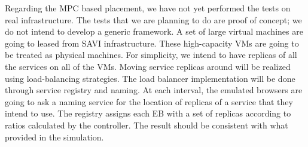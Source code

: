  Regarding the MPC based placement, we have not yet performed the tests on real infrastructure.  The tests that we are planning to do are proof of concept; we do not intend to develop a generic framework. A set of large virtual machines are going to leased from SAVI infrastructure.  These high-capacity VMs are going to be treated as physical machines.  For simplicity, we intend to have replicas of all the services on all of the VMs.  Moving service replicas around will be realized using load-balancing strategies. The load balancer implementation will be done through service registry and naming.  At each interval, the emulated browsers are going to ask a naming service for the location of replicas of a service that they intend to use.  The registry assigns each EB with a set of replicas according to ratios calculated by the controller.  The result should be consistent with what provided in the simulation. 
 

    


